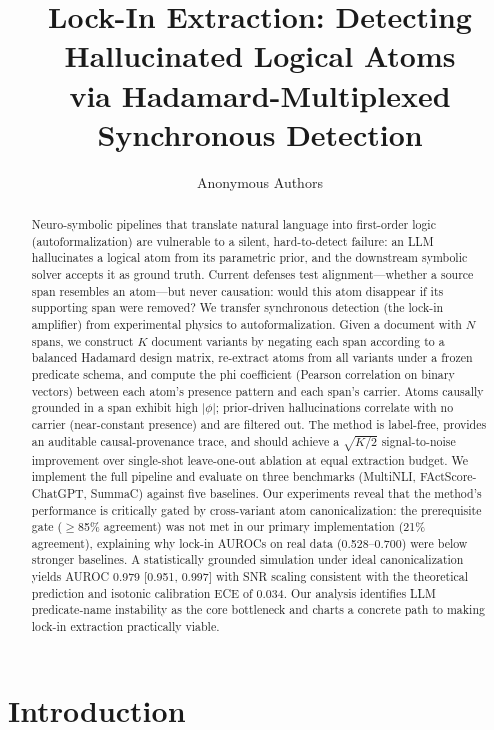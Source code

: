 \documentclass[11pt,letterpaper]{article}
\title{\textbf{Lock-In Extraction: Detecting Hallucinated Logical Atoms\\
via Hadamard-Multiplexed Synchronous Detection}}
\author{Anonymous Authors}
\date{}
\begin{document}
\maketitle

\begin{abstract}
Neuro-symbolic pipelines that translate natural language into first-order logic (autoformalization) are vulnerable to a
silent, hard-to-detect failure: an LLM hallucinates a logical atom from its parametric prior, and the downstream symbolic
solver accepts it as ground truth. Current defenses test alignment---whether a source span resembles an atom---but never
causation: would this atom disappear if its supporting span were removed? We transfer synchronous detection (the lock-in
amplifier) from experimental physics to autoformalization. Given a document with $N$ spans, we construct $K$ document
variants by negating each span according to a balanced Hadamard design matrix, re-extract atoms from all variants under
a frozen predicate schema, and compute the phi coefficient (Pearson correlation on binary vectors) between each atom's
presence pattern and each span's carrier. Atoms causally grounded in a span exhibit high $|\phi|$; prior-driven
hallucinations correlate with no carrier (near-constant presence) and are filtered out. The method is label-free,
provides an auditable causal-provenance trace, and should achieve a $\sqrt{K/2}$ signal-to-noise improvement over
single-shot leave-one-out ablation at equal extraction budget. We implement the full pipeline and evaluate on three
benchmarks (MultiNLI, FActScore-ChatGPT, SummaC) against five baselines. Our experiments reveal that the method's
performance is critically gated by cross-variant atom canonicalization: the prerequisite gate ($\geq$85\% agreement)
was not met in our primary implementation (21\% agreement), explaining why lock-in AUROCs on real data (0.528--0.700)
were below stronger baselines. A statistically grounded simulation under ideal canonicalization yields AUROC 0.979
[0.951, 0.997] with SNR scaling consistent with the theoretical prediction and isotonic calibration ECE of 0.034. Our
analysis identifies LLM predicate-name instability as the core bottleneck and charts a concrete path to making lock-in
extraction practically viable.
\end{abstract}

\section{Introduction}
\end{document}

